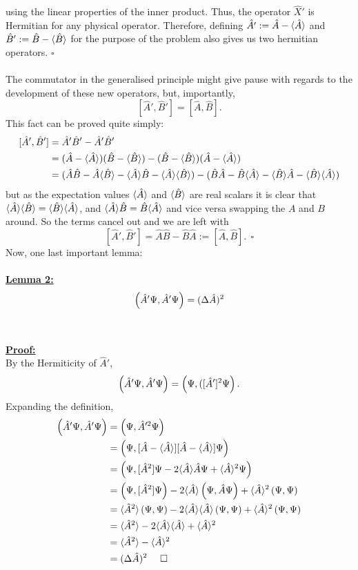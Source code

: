 using the linear properties of the inner product. Thus, the operator $\hat{X}'$ is Hermitian for any physical operator. Therefore, defining $\hat{A'}:=\hat{A}-\langle\hat{A}\rangle$ and $\hat{B}':=\hat{B}-\langle\hat{B}\rangle$ for the purpose of the problem also gives us two hermitian operators. $\square$
\\\\
The commutator in the generalised principle might give pause with regards to the development of these new operators, but, importantly,
$$
[\hat{A}',\hat{B}']=[\hat{A},\hat{B}].
$$
This fact can be proved quite simply:
$$
\begin{aligned}
[\hat{A}',\hat{B}']&= \hat{A}'\hat{B}'- \hat{A}'\hat{B}'\\
&= (\hat{A}-\qexp{\hat{A}})(\hat{B}-\qexp{\hat{B}})-(\hat{B}-\qexp{\hat{B}}) (\hat{A}-\qexp{\hat{A}})\\
&=(\hat{A}\hat{B}-\hat{A}\qexp{\hat{B}}-\qexp{\hat{A}}\hat{B}-\qexp{\hat{A}}\qexp{\hat{B}})-(\hat{B}\hat{A}-\hat{B}\qexp{\hat{A}}-\qexp{\hat{B}}\hat{A}-\qexp{\hat{B}}\qexp{\hat{A}})
\end{aligned}
$$
but as the expectation values $\langle\hat{A}\rangle$ and $\langle\hat{B}\rangle$ are real scalars it is clear that $\langle\hat{A}\rangle\langle\hat{B}\rangle=\langle\hat{B}\rangle\langle\hat{A}\rangle$, and $\langle\hat{A}\rangle\hat{B}=\hat{B}\langle\hat{A}\rangle$ and vice versa swapping the $A$ and $B$ around. So the terms cancel out and we are left with
$$
[\hat{A}',\hat{B}']=\hat{A}\hat{B}-\hat{B}\hat{A}:=[\hat{A},\hat{B}]. \:\:\square
$$
Now, one last important lemma:\\\\
\underline{\textbf{Lemma 2:}}\\
$$\left(\hat{A}'\Psi,\hat{A}'\Psi\right)=(\Delta\hat{A})^2$$
\\\\
\underline{\textbf{Proof:}}\\
By the Hermiticity of $\hat{A}'$,
$$
\left(\hat{A}'\Psi,\hat{A}'\Psi\right)=\left(\Psi,([\hat{A}']^2\Psi\right).
$$
Expanding the definition,
$$
\begin{aligned}
\left(\hat{A}'\Psi,\hat{A}'\Psi\right)&=\left(\Psi,\hat{A}'^2\Psi\right)\\
&=\left(\Psi,[\hat{A}-\langle\hat{A}\rangle][\hat{A}-\langle\hat{A}\rangle]\Psi\right)\\
&=\left(\Psi,[\hat{A}^{2}]\Psi-2\langle\hat{A}\rangle\hat{A}\Psi+\langle\hat{A}\rangle^2\Psi\right)\\
&=\left(\Psi,[\hat{A}^{2}]\Psi\right)-2\langle\hat{A}\rangle\left(\Psi,\hat{A}\Psi\right)+\langle\hat{A}\rangle^2\left(\Psi,\Psi\right)\\
&=\langle\hat{A}^2\rangle\left(\Psi,\Psi\right)-2\langle\hat{A}\rangle\langle\hat{A}\rangle\left(\Psi,\Psi\right)+\langle\hat{A}\rangle^2\left(\Psi,\Psi\right)\\
&= \langle\hat{A}^2\rangle-2\langle\hat{A}\rangle\langle\hat{A}\rangle+\langle\hat{A}\rangle^2\\
&=\langle\hat{A}^2\rangle-\langle\hat{A}\rangle^2\\
&=(\Delta\hat{A})^2 \:\:\:\:\:\:\square
\end{aligned}
$$
